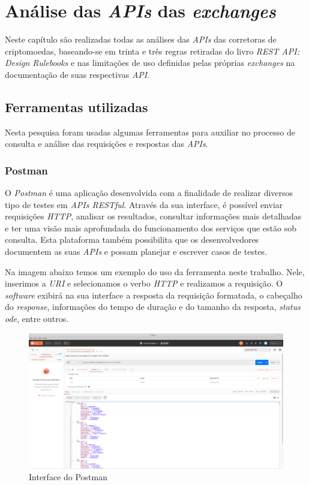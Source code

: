 \chapter{Análise das \textit{APIs} das \textit{exchanges}}
\label{chap:desenvolvimento}

Neste capítulo são realizadas todas as análises das \textit{APIs} das corretoras de criptomoedas, baseando-se em trinta e três regras retiradas do livro \textit{REST API: Design Rulebooks} e nas limitações de uso definidas pelas próprias \textit{exchanges} na documentação de suas respectivas \textit{API}.

\section{Ferramentas utilizadas}

Nesta pesquisa foram usadas algumas ferramentas para auxiliar no processo de consulta e análise das requisições e respostas das \textit{APIs}.

\subsection{Postman}
O \textit{Postman} é uma aplicação desenvolvida com a finalidade de realizar diversos tipo de testes em \textit{APIs RESTful}. Através da sua interface, é possível enviar requisições \textit{HTTP}, analisar os resultados, consultar informações mais detalhadas e ter uma visão mais aprofundada do funcionamento dos serviços que estão sob consulta. Esta plataforma também possibilita que os desenvolvedores documentem as suas \textit{APIs} e possam planejar e escrever casos de testes.

Na imagem abaixo temos um exemplo do uso da ferramenta neste trabalho. Nele, inserimos a \textit{URI} e selecionamos o verbo \textit{HTTP} e realizamos a requisição. O \textit{software} exibirá na sua interface a resposta da requisição formatada, o cabeçalho do \textit{response}, informações do tempo de duração e do tamanho da resposta, \textit{status ode}, entre outros.
\begin{figure}[h]
	\centering
	\includegraphics[width=\textwidth]{imagens/postman.png}
	\caption{Interface do Postman}
	\label{fig:postman}
\end{figure}

